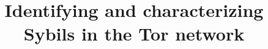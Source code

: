 \documentclass[letterpaper,twocolumn,10pt]{article}
\begin{document}
\title{\Large \bf Identifying and characterizing Sybils in the Tor network}

\author{}

\maketitle

\thispagestyle{empty}















% 

{\footnotesize 
}


\end{document}
